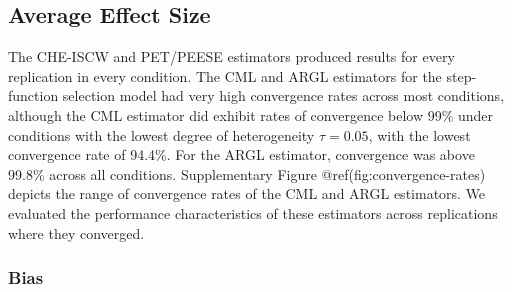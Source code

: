 \documentclass[
]{article}
\begin{document}
\subsection{Average Effect Size}\label{average-effect-size}

The CHE-ISCW and PET/PEESE estimators produced results for every
replication in every condition. The CML and ARGL estimators for the
step-function selection model had very high convergence rates across
most conditions, although the CML estimator did exhibit rates of
convergence below 99\% under conditions with the lowest degree of
heterogeneity \(\tau = 0.05\), with the lowest convergence rate of
94.4\%. For the ARGL estimator, convergence was above 99.8\% across all
conditions. Supplementary Figure @ref(fig:convergence-rates) depicts the
range of convergence rates of the CML and ARGL estimators. We evaluated
the performance characteristics of these estimators across replications
where they converged.

\subsubsection{Bias}\label{bias}
\end{document}
